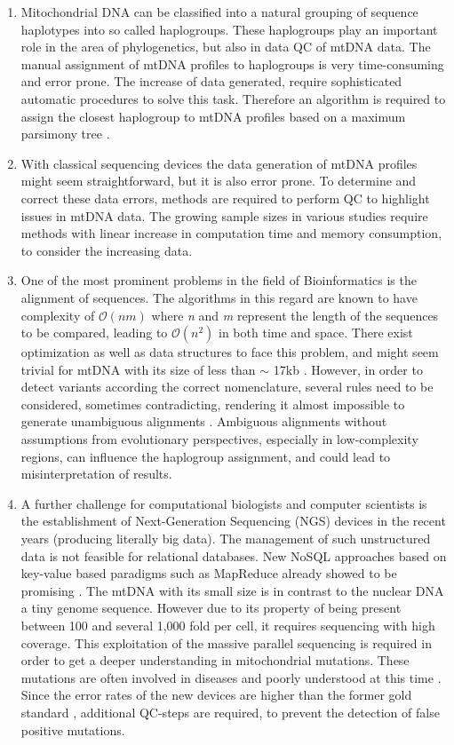 \begin{enumerate}
\item 
Mitochondrial DNA can be classified into a natural grouping of sequence haplotypes into so called haplogroups. These haplogroups play an important role in the area of phylogenetics, but also in data QC of mtDNA data. The manual assignment of mtDNA profiles to haplogroups is very time-consuming and error prone. The increase of data generated, require sophisticated automatic procedures to solve this task. Therefore an algorithm is required to assign the closest haplogroup to mtDNA profiles based on a maximum parsimony tree \cite{VanOven2009}. 
\item
With classical sequencing devices the data generation of mtDNA profiles might seem straightforward, but it is also error prone. To determine and correct these data errors, methods are required to perform QC to highlight issues in mtDNA data. The growing sample sizes in various studies require methods with linear increase in computation time and memory consumption, to consider the increasing data. 
\item 
One of the most prominent problems in the field of Bioinformatics is the alignment of sequences. The algorithms in this regard are known to have complexity of $\mathcal O(nm)$ where \textit{n} and \textit{m} represent the length of the sequences to be compared, leading to $\mathcal O(n^2)$ in both time and space. There exist optimization as well as data structures to face this problem, and might seem trivial for mtDNA with its size of less than $\sim$ 17kb \cite{Andrews1999}. However, in order to detect variants according the correct nomenclature, several rules need to be considered, sometimes contradicting, rendering it almost impossible to generate unambiguous alignments \cite{Bandelt2008}. Ambiguous alignments without assumptions from evolutionary perspectives, especially in low-complexity regions, can influence the haplogroup assignment, and could lead to misinterpretation of results.  
\item 
A further challenge for computational biologists and computer scientists is the establishment of Next-Generation Sequencing (NGS) devices in the recent years (producing literally big data). The management of such unstructured data is not feasible for relational databases. New NoSQL approaches based on key-value based paradigms such as MapReduce \cite{Dean2008} already showed to be promising \cite{Schonherr2012}. The mtDNA with its small size is in contrast to the nuclear DNA a tiny genome sequence. However due to its property of being present between 100 and several 1,000 fold per cell, it requires sequencing with high coverage. This exploitation of the massive parallel sequencing is required in order to get a deeper understanding in mitochondrial mutations. These mutations are often involved in diseases and poorly understood at this time \cite{Wallace2013}. Since the error rates of the new devices are higher than the former gold standard \cite{Wang2011}, additional QC-steps are required, to prevent the detection of false positive mutations. 

\end{enumerate}

